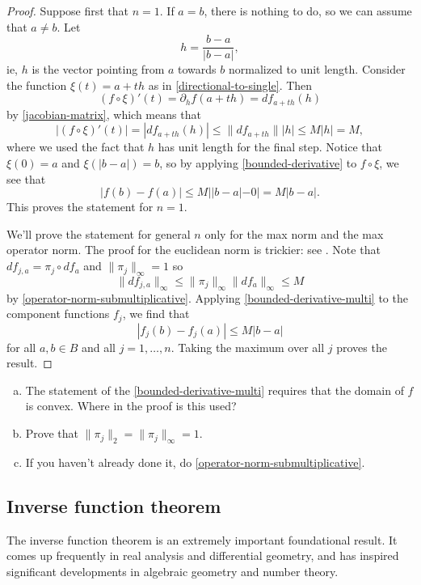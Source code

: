 \begin{proof}
	Suppose first that $n = 1$. If $a = b$, there is nothing to do, so we can assume that $a \neq b$. Let \[ h = \frac{b-a}{|b-a|}, \]
	ie, $h$ is the vector pointing from $a$ towards $b$ normalized to unit length. Consider the function $\xi(t) = a + th$ as in \cref{directional-to-single}. Then
	\[ (f \circ \xi)'(t) = \partial_h f(a + th) = df_{a + th}(h)  \]
	by \cref{jacobian-matrix}, which means that 
	\[ |(f \circ \xi)'(t)| = |df_{a + th}(h)| \leq \|df_{a + th}\| |h| \leq M|h| = M, \]
	where we used the fact that $h$ has unit length for the final step. Notice that $\xi(0) = a$ and $\xi(|b-a|) =  b$, so by applying \cref{bounded-derivative} to $f \circ \xi$, we see that 
	\[ |f(b) - f(a)| \leq M||b-a| - 0| = M|b-a|.  \]
	This proves the statement for $n = 1$.
	
	We'll prove the statement for general $n$ only for the max norm and the max operator norm. The proof for the euclidean norm is trickier: see \cite[theorem 9.19]{rudin}. Note that $df_{j,a} = \pi_j \circ df_a$ and $\|\pi_j\|_\infty = 1$ so \[ \|df_{j,a}\|_\infty \leq \|\pi_j\|_\infty \|df_a\|_\infty \leq M \]
	by \cref{operator-norm-submultiplicative}. Applying \cref{bounded-derivative-multi} to the component functions $f_j$, we find that 
	\[ |f_j(b) - f_j(a)| \leq M|b-a| \]
	for all $a, b \in B$ and all $j = 1, \dotsc, n$. Taking the maximum over all $j$ proves the result. 
\end{proof}

\begin{exercise}
	\begin{enumerate}[(a)]
		\item The statement of the \cref{bounded-derivative-multi} requires that the domain of $f$ is convex. Where in the proof is this used?
		\item Prove that $\|\pi_j\|_2 = \|\pi_j\|_\infty = 1$. 
		\item If you haven't already done it, do \cref{operator-norm-submultiplicative}. 
	\end{enumerate} 
\end{exercise}

\subsection{Inverse function theorem}

The inverse function theorem is an extremely important foundational result. It comes up frequently in real analysis and differential geometry, and has inspired significant developments in algebraic geometry and number theory. 

